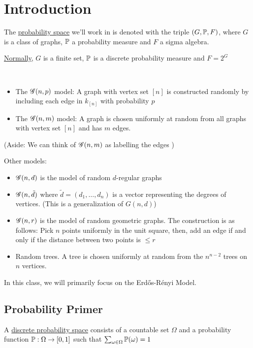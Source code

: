 \section{Introduction}

\begin{definition}
    The \underline{probability space} we'll work in is denoted with the triple $(G, \operatorname{\mathbb{P}}, F)$, where $G$ is a class of graphs, $\operatorname{\mathbb{P}}$ a probability measure and $F$ a sigma algebra.
\end{definition}

\underline{Normally}, $G$ is a finite set, $\operatorname{\mathbb{P}}$ is a discrete probability measure and $F = 2^G$

\begin{definition}
    ~
    \begin{itemize}
        \item The $\operatorname{\mathscr{G}}(n,p)$ model: A graph with vertex set $[n]$ is constructed randomly by including each edge in $k_{[n]}$ with probability $p$
        \item The $\operatorname{\mathscr{G}}(n,m)$ model: A graph is chosen uniformly at random from all graphs with vertex set $[n]$ and has $m$ edges.
    \end{itemize}
\end{definition}

(Aside: We can think of $\operatorname{\mathscr{G}}(n,m)$ as labelling the edges )

Other models:
\begin{itemize}
    \item $\operatorname{\mathscr{G}}(n,d)$ is the model of random $d$-regular graphs
    \item $\operatorname{\mathscr{G}}(n,\tilde{d})$ where $\tilde{d} = (d_1, \ldots, d_n)$ is a vector representing the degrees of vertices. (This is a generalization of $G(n,d)$)
    \item $\operatorname{\mathscr{G}}(n,r)$ is the model of random geometric graphs. The construction is as follows: Pick $n$ points uniformly in the unit square, then, add an edge if and only if the distance between two points is $\leq r$
    \item Random trees. A tree is chosen uniformly at random from the $n^{n-2}$ trees on $n$ vertices.
\end{itemize}

In this class, we will primarily focus on the Erd\H{o}s-R\'enyi Model.

\subsection{Probability Primer}
\begin{definition}
    A \underline{discrete probability space} consists of a countable set $\Omega$ and a probability function $\operatorname{\mathbb{P}}: \Omega \rightarrow [0,1]$ such that $\sum_{\omega \in \Omega} \operatorname{\mathbb{P}}(\omega) = 1$
\end{definition}


